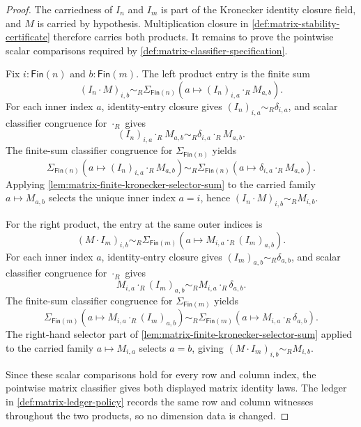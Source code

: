\begin{proof}
The carriedness of $I_n$ and $I_m$ is part of the Kronecker identity closure
field, and $M$ is carried by hypothesis. Multiplication closure in
\autoref{def:matrix-stability-certificate} therefore carries both products.
It remains to prove the pointwise scalar comparisons required by
\autoref{def:matrix-classifier-specification}.

Fix $i:\mathsf{Fin}(n)$ and $b:\mathsf{Fin}(m)$. The left product entry is the
finite sum
$$
(I_n\cdot M)_{i,b}
\sim_R
\Sigma_{\mathsf{Fin}(n)}(a\mapsto (I_n)_{i,a}\cdot_R M_{a,b}).
$$
For each inner index $a$, identity-entry closure gives
$(I_n)_{i,a}\sim_R\delta_{i,a}$, and scalar classifier congruence for
$\cdot_R$ gives
$$
(I_n)_{i,a}\cdot_R M_{a,b}
\sim_R
\delta_{i,a}\cdot_R M_{a,b}.
$$
The finite-sum classifier congruence for $\Sigma_{\mathsf{Fin}(n)}$ yields
$$
\Sigma_{\mathsf{Fin}(n)}(a\mapsto (I_n)_{i,a}\cdot_R M_{a,b})
\sim_R
\Sigma_{\mathsf{Fin}(n)}(a\mapsto \delta_{i,a}\cdot_R M_{a,b}).
$$
Applying \autoref{lem:matrix-finite-kronecker-selector-sum} to the carried
family $a\mapsto M_{a,b}$ selects the unique inner index $a=i$, hence
$(I_n\cdot M)_{i,b}\sim_R M_{i,b}$.

For the right product, the entry at the same outer indices is
$$
(M\cdot I_m)_{i,b}
\sim_R
\Sigma_{\mathsf{Fin}(m)}(a\mapsto M_{i,a}\cdot_R (I_m)_{a,b}).
$$
For each inner index $a$, identity-entry closure gives
$(I_m)_{a,b}\sim_R\delta_{a,b}$, and scalar classifier congruence for
$\cdot_R$ gives
$$
M_{i,a}\cdot_R (I_m)_{a,b}
\sim_R
M_{i,a}\cdot_R \delta_{a,b}.
$$
The finite-sum classifier congruence for $\Sigma_{\mathsf{Fin}(m)}$ yields
$$
\Sigma_{\mathsf{Fin}(m)}(a\mapsto M_{i,a}\cdot_R (I_m)_{a,b})
\sim_R
\Sigma_{\mathsf{Fin}(m)}(a\mapsto M_{i,a}\cdot_R \delta_{a,b}).
$$
The right-hand selector part of
\autoref{lem:matrix-finite-kronecker-selector-sum} applied to the carried
family $a\mapsto M_{i,a}$ selects $a=b$, giving
$(M\cdot I_m)_{i,b}\sim_R M_{i,b}$.

Since these scalar comparisons hold for every row and column index, the
pointwise matrix classifier gives both displayed matrix identity laws. The
ledger in \autoref{def:matrix-ledger-policy} records the same row and column
witnesses throughout the two products, so no dimension data is changed.
\end{proof}
